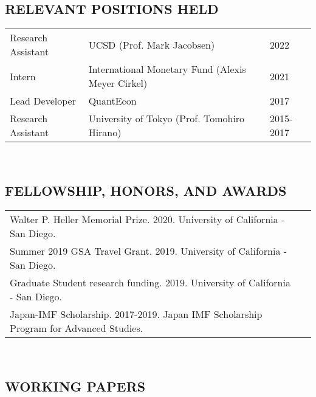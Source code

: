 \documentclass{article}
\begin{document}
 
\subsection*{RELEVANT POSITIONS HELD}

\begin{tabularx}{1.2\textwidth}{lXX}
    Research Assistant & UCSD (Prof. Mark Jacobsen) &  2022 \\
    Intern & International Monetary Fund (Alexis Meyer Cirkel) & 2021 \\
    Lead Developer & QuantEcon &  2017 \\
    Research Assistant & University of Tokyo (Prof. Tomohiro Hirano) &  2015-2017 \\
\end{tabularx}
\\

\subsection*{FELLOWSHIP, HONORS, AND AWARDS}

\begin{tabularx}{\textwidth}{XX}
    Walter P. Heller Memorial Prize. 2020. University of California - San Diego.\\
    Summer 2019 GSA Travel Grant. 2019. University of California - San Diego.\\
    Graduate Student research funding. 2019. University of California - San Diego.  \\
    Japan-IMF Scholarship. 2017-2019. Japan IMF Scholarship Program for Advanced Studies. \\
\end{tabularx}
\\

\subsection*{WORKING PAPERS}
\end{document}
